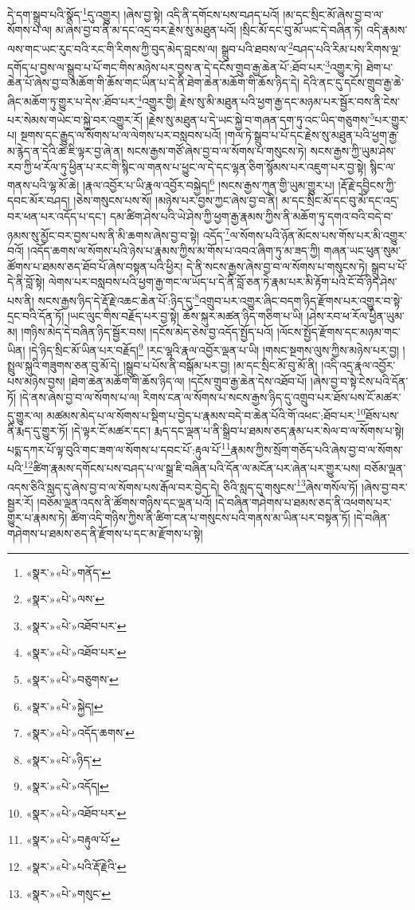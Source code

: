 དེ་དག་སྒྲུབ་པའི་སྣོད་\footnote{«སྣར་»«པེ་»གནོད་}དུ་འགྱུར། །ཞེས་བྱ་སྟེ། འདི་ནི་དགོངས་པས་བཤད་པའོ། །མ་དང་སྲིང་མོ་ཞེས་བྱ་བ་ལ་སོགས་པ་ལ། མ་ཞེས་བྱ་བ་ནི་མ་དང་འདྲ་བར་རྗེས་སུ་མཐུན་པའོ། །སྲིང་མོ་དང་བུ་མོ་ཡང་དེ་བཞིན་ཏེ། འདི་རྣམས་ལས་གང་ཡང་རུང་བའི་རང་གི་རིགས་ཀྱི་བུད་མེད་བླངས་ལ། སྒྲུབ་པའི་ཐབས་ལ་\footnote{«སྣར་»«པེ་»ལས་}བཤད་པའི་རིམ་པས་རིགས་ལྔ་དགོད་པ་བྱས་ལ་སྒྲུབ་པ་པོ་གང་གིས་མཉེས་པར་བྱས་ན་དེ་དངོས་གྲུབ་རྒྱ་ཆེན་པོ་:ཐོབ་པར་\footnote{«སྣར་»«པེ་»འཐོབ་པར་}འགྱུར་ཏེ། ཐེག་པ་ཆེན་པོ་ཞེས་བྱ་བ་མཆོག་གི་ཆོས་གང་ཡིན་པ་དེ་ནི་ཐེག་ཆེན་མཆོག་གི་ཆོས་ཉིད་དེ། དེའི་ནང་དུ་དངོས་གྲུབ་རྒྱ་ཆེ་ཞིང་མཆོག་ཏུ་གྱུར་པ་དེས་:ཐོབ་པར་\footnote{«སྣར་»«པེ་»འཐོབ་པར་}འགྱུར་གྱི། རྗེས་སུ་མི་མཐུན་པའི་ཕྱག་རྒྱ་དང་མཉམ་པར་སྦྱོར་བས་ནི་ངེས་པར་སེམས་གཡེང་བ་སྐྱེ་བར་འགྱུར་རོ། །རྗེས་སུ་མཐུན་པ་དེ་ཡང་སྐྱེ་བ་གཞན་དག་ཏུ་འང་ཡིད་གཅུགས་\footnote{«སྣར་»«པེ་»བཅུགས་}པར་གྱུར་པ། སྔགས་དང་རྒྱུད་ལ་སོགས་པ་ལ་ལེགས་པར་བསླབས་པའོ། །གལ་ཏེ་སྒྲུབ་པ་པོ་དང་རྗེས་སུ་མཐུན་པའི་ཕྱག་རྒྱ་མ་རྙེད་ན་དེའི་ཚེ་ཇི་ལྟར་བྱ་ཞེ་ན། སངས་རྒྱས་གཙོ་ཞེས་བྱ་བ་ལ་སོགས་པ་གསུངས་ཏེ། སངས་རྒྱས་ཀྱི་ཡུམ་ཤེས་རབ་ཀྱི་ཕ་རོལ་ཏུ་ཕྱིན་པ་རང་གི་སྙིང་ལ་གནས་པ་ཕྱུང་ལ་དེ་དང་ལྷན་ཅིག་སྙོམས་པར་འཇུག་པར་བྱ་སྟེ། སྙིང་ལ་གནས་པའི་ལྷ་མོ་ཆེ། །རྣལ་འབྱོར་པ་ཡི་རྣལ་འབྱོར་བསྐྱེད།\footnote{«སྣར་»«པེ་»སྐྱེད།} །སངས་རྒྱས་ཀུན་གྱི་ཡུམ་གྱུར་པ། །རྡོ་རྗེ་དབྱིངས་ཀྱི་དབང་མོར་བཤད། །ཅེས་གསུངས་པས་སོ། །མཉེས་པར་བྱས་ཀྱང་ཞེས་བྱ་བ་ནི། མ་དང་སྲིང་མོ་དང་བུ་མོ་དང་འདྲ་བར་ཕན་པར་འདོད་པ་དང་། དམ་ཚིག་ཤེས་པའི་ཡེ་ཤེས་ཀྱི་ཕྱག་རྒྱ་རྣམས་ཀྱིས་ནི་མཆོག་ཏུ་དགའ་བའི་བདེ་བ་ཉམས་སུ་མྱོང་བར་བྱས་པས་ནི་མི་ཆགས་ཞེས་བྱ་བ་སྟེ། འདོད་\footnote{«སྣར་»«པེ་»འདོད་ཆགས་}ལ་སོགས་པའི་ཉོན་མོངས་པས་གོས་པར་མི་འགྱུར་བའོ། །འདོད་ཆགས་ལ་སོགས་པའི་ཉེས་པ་རྣམས་ཀྱིས་མ་གོས་པ་འབའ་ཞིག་ཏུ་མ་ཟད་ཀྱི། གཞན་ཡང་ཕུན་སུམ་ཚོགས་པ་ཐམས་ཅད་ཐོབ་པོ་ཞེས་བསྟན་པའི་ཕྱིར། དེ་ནི་སངས་རྒྱས་ཞེས་བྱ་བ་ལ་སོགས་པ་གསུངས་ཏེ། སྒྲུབ་པ་པོ་དེ་ནི་བློ་སྟེ། ལེགས་པར་བསླབས་པའི་ཕྱག་རྒྱ་གང་ལ་ཡོད་པ་དེ་ནི་བློ་ཅན་ཏེ་རྣམ་པར་མི་རྟོག་པའི་ངོ་བོ་ཉིད་ཤེས་པས་ནི། སངས་རྒྱས་ཉིད་དེ་རྡོ་རྗེ་འཆང་ཆེན་པོ་:ཉིད་དུ་\footnote{«སྣར་»«པེ་»ཉིད་}འགྲུབ་པར་འགྱུར་ཞིང་བདག་ཉིད་རྫོགས་པར་འགྱུར་བ་སྟེ་དྲང་བའི་དོན་ཏོ། །ཡང་ལུང་གིས་བརྗོད་པར་བྱ་སྟེ། ཆོས་སྐུར་མཚན་ཉིད་གཅིག་པ་ཡི། །ཤེས་རབ་ཕ་རོལ་ཕྱིན་ཡུམ་མ། །གཉིས་མེད་དེ་བཞིན་ཉིད་སྦྱོར་བས། །དངོས་མེད་ཅེས་བྱ་འདོད་སྤྱོད་པའོ། །ལོངས་སྤྱོད་རྫོགས་དང་མཉམ་གང་ཡིན། །དེ་ཉིད་སྲིང་མོ་ཡིན་པར་བརྗོད།\footnote{«སྣར་»«པེ་»འདོད།} །རང་ལྷའི་རྣལ་འབྱོར་ལྡན་པ་ཡི། །གསང་སྔགས་ལུས་ཀྱིས་མཉེས་པར་བྱ། །སྤྲུལ་སྐུའི་གཟུགས་ཅན་བུ་མོ་དེ། །སྒྲུབ་པ་པོས་ནི་བསྒོམ་པར་བྱ། །མ་དང་སྲིང་མོ་བུ་མོ་ནི། །འདི་འདྲ་རྣལ་འབྱོར་པས་མཉེས་བྱས། །ཐེག་ཆེན་མཆོག་གི་ཆོས་ཉིད་ལ། །དངོས་གྲུབ་རྒྱ་ཆེན་དེས་འཐོབ་པོ། །ཞེས་བྱ་བ་སྟེ་ངེས་པའི་དོན་ཏོ། །དེ་ནས་ཞེས་བྱ་བ་ལ་སོགས་པ་ལ། རིགས་ངན་ལ་སོགས་པ་སངས་རྒྱས་ཉིད་དུ་འགྲུབ་པར་ཐོས་པས་ངོ་མཚར་དུ་གྱུར་ལ། མཚམས་མེད་པ་ལ་སོགས་པ་སྡིག་པ་བྱེད་པ་རྣམས་བདེ་བ་ཆེན་པོའི་གོ་འཕང་:ཐོབ་པར་\footnote{«སྣར་»«པེ་»འཐོབ་པར་}ཐོས་པས་ནི་རྨད་དུ་གྱུར་ཏོ། །དེ་ལྟར་ངོ་མཚར་དང་། རྨད་དང་ལྡན་པ་ནི་སྒྲིབ་པ་ཐམས་ཅད་རྣམ་པར་སེལ་བ་ལ་སོགས་པ་སྟེ། པདྨ་དཀར་པོ་ལྟ་བུའི་གང་ཟག་ལ་སོགས་པ་དབང་པོ་:རྟུལ་པོ་\footnote{«སྣར་»«པེ་»བརྟུལ་པོ་}རྣམས་ཀྱིས་སྲོག་གཅོད་པའི་ཞེས་བྱ་བ་ལ་སོགས་པའི་\footnote{«སྣར་»«པེ་»པའི་རྡོ་རྗེའི་}ཚིག་རྣམས་དགོངས་པས་བཤད་པ་ལ་སྒྲ་ཇི་བཞིན་པའི་དོན་ལ་མངོན་པར་ཞེན་པར་གྱུར་པས། བཅོམ་ལྡན་འདས་ཅིའི་སླད་དུ་ཞེས་བྱ་བ་ལ་སོགས་པས་རྒོལ་བར་བྱེད་དེ། ཅིའི་སླད་དུ་གསུངས་\footnote{«སྣར་»«པེ་»གསུང་}ཞེས་གསོལ་ཏོ། །ཞེས་བྱ་བར་སྦྱར་རོ། །བཅོམ་ལྡན་འདས་ནི་ཚོགས་གཉིས་དང་ལྡན་པའོ། །དེ་བཞིན་གཤེགས་པ་ཐམས་ཅད་ནི་འཕགས་པར་གྱུར་པ་རྣམས་ཏེ། ཚིག་འདི་གཉིས་ཀྱིས་ནི་ཚིག་ངན་པ་གསུངས་པའི་གནས་མ་ཡིན་པར་བསྟན་ཏོ། །དེ་བཞིན་གཤེགས་པ་ཐམས་ཅད་ནི་རྫོགས་པ་དང་མ་རྫོགས་པ་སྟེ། 